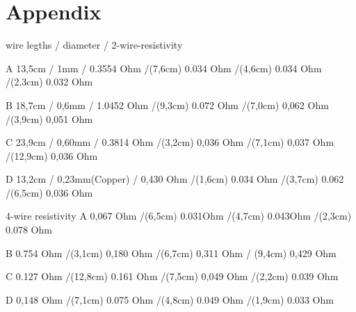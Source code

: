 \section{Appendix}




wire legths / diameter / 2-wire-resistivity 

A 13,5cm / 1mm / 0.3554 Ohm /(7,6cm) 0.034 Ohm /(4,6cm) 0.034 Ohm /(2,3cm) 0.032 Ohm

B 18,7cm / 0,6mm / 1.0452 Ohm /(9,3cm) 0.072 Ohm /(7,0cm) 0,062 Ohm /(3,9cm) 0,051 Ohm

C 23,9cm / 0,60mm / 0.3814 Ohm /(3,2cm) 0,036 Ohm /(7,1cm) 0,037 Ohm /(12,9cm) 0,036 Ohm

D 13,2cm / 0,23mm(Copper) / 0,430 Ohm /(1,6cm) 0.034 Ohm /(3,7cm) 0.062 /(6,5cm) 0,036 Ohm

4-wire resistivity
A 0,067 Ohm /(6,5cm) 0.031Ohm /(4,7cm) 0.043Ohm /(2,3cm) 0.078 Ohm

B 0.754 Ohm /(3,1cm) 0,180 Ohm /(6,7cm) 0,311 Ohm / (9,4cm) 0,429 Ohm

C 0.127 Ohm /(12,8cm) 0.161 Ohm /(7,5cm) 0,049 Ohm /(2,2cm) 0.039 Ohm

D 0,148 Ohm /(7,1cm) 0.075 Ohm /(4,8cm) 0.049 Ohm /(1,9cm) 0.033 Ohm

